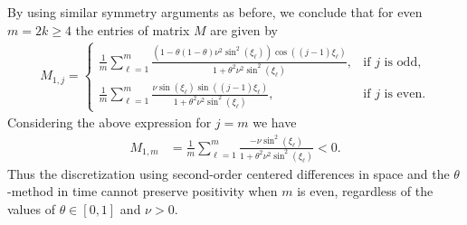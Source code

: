 \documentclass[a4paper]{article}
\begin{document}
\begin{description}[style=unboxed,leftmargin=0cm]
\item [{Case 1:} $m$ is {even}.]
\item \noindent By using similar symmetry arguments as before, we conclude that for {even} $m=2k\ge 4$
the entries of matrix $M$ are given by
\begin{align*}
	M_{1,j} = \begin{cases}
				\displaystyle
				\frac{1}{m} \sum_{\ell=1}^{m}\frac{\left(1-\theta(1-\theta)\nu^2\sin^2(\xi_\ell)
					\right)\cos((j-1)\xi_\ell)}{1+\theta^2\nu^2\sin^2(\xi_\ell)}, &\mbox{if } j
					\text{ is odd}, \\[20pt]
				\displaystyle
				\frac{1}{m} \sum_{\ell=1}^{m} \frac{\nu \sin(\xi_\ell)\sin((j-1)\xi_\ell)}
					{1+\theta^2\nu^2 \sin^2 (\xi_\ell)}, &\mbox{if } j \text{ is even}.
			  \end{cases}
\end{align*}
Considering  the above expression for $j = m$ we have
\begin{align*}
    M_{1,m} & =  \frac{1}{m} \sum_{\ell=1}^{m} \frac{- \nu \sin^2 (\xi_\ell)}{1+\theta^2\nu^2 \sin^2 (\xi_\ell)} < 0.
\end{align*}
Thus the discretization using second-order centered differences in space and the $\theta$-method in time cannot preserve positivity when $m$ is even, regardless of the
values of $\theta\in[0,1]$ and $\nu>0$.


\end{description}
\end{document}
